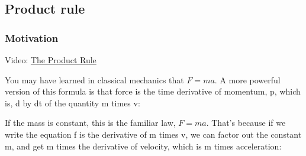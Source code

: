 \documentclass[pdftex, brazil, 12pt, twoside]{article}
\begin{document}
\subsection{Product rule}
\label{u2-product-rule}

\subsubsection{Motivation}
\label{u2-product-rule-motivation}

Video: \href{https://www.youtube.com/watch?v=6wgx9dMg7VI}{The Product Rule}

You may have learned in classical mechanics
that $F = ma$.
A more powerful version of this formula
is that force is the time derivative of momentum, p,
which is, d by dt of the quantity m times v:

\begin{figure}[H]
  \begin{center}
  \end{center}
\end{figure}

If the mass is constant, this is the familiar law, $F = ma$.
That's because if we write the equation f
is the derivative of m times v, we
can factor out the constant m, and get
m times the derivative of velocity,
which is m times acceleration:

\begin{figure}[H]
  \begin{center}
  \end{center}
\end{figure}
\end{document}
